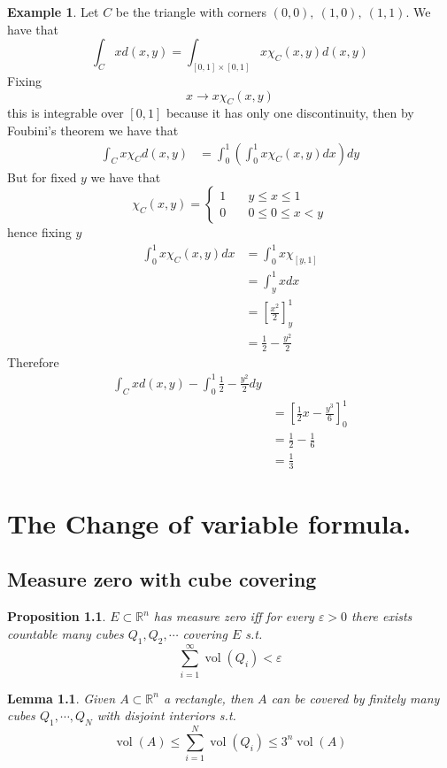 \documentclass[11pt,openany]{book}
\theoremstyle{plain}
\newtheorem{lemma}{Lemma}[chapter]
\newtheorem{proposition}{Proposition}[chapter]
\theoremstyle{definition}
\newtheorem{example}{Example}[chapter]
\theoremstyle{remark}
\newcommand{\R}{\mathbb{R}}
\newcommand{\vol}{\operatorname{vol}}
\begin{document}
\begin{example}
    Let $C$ be the triangle with corners $(0,0), \ (1, 0), \ (1,1)$. We have that 
    $$\int_C x d(x,y) = \int_{[0,1] \times [0,1]} x \chi_C (x,y) d(x,y)$$
    Fixing 
    $$x \to x \chi_C (x,y)$$
    this is integrable over $[0,1]$ because it has only one discontinuity, then by Foubini's theorem we have that 
    \begin{align*}
        \int_C x \chi_C d(x,y) &= \int_{0}^1 \left(\int_{0}^1 x \chi_C (x,y) dx\right)dy 
    \end{align*}
    But for fixed $y$ we have that 
    $$\chi_C (x,y) = \begin{cases}
        1 \quad&  y \le x \le 1\\
        0 \quad& 0 \le 0 \le x < y
    \end{cases}$$
    hence fixing $y$
    \begin{align*}
        \int_{0}^1 x \chi_C(x,y) dx  &= \int_{0}^1 x \chi_{[y,1]} \\
        &= \int_y^1 x dx \\
        &= [\frac{x^2}{2}]_y^1 \\
        &= \frac{1}{2} - \frac{y^2}{2}
    \end{align*}
    Therefore 
    \begin{align*}
        \int_C x d(x,y) - \int_0^1 \frac{1}{2} - \frac{y^2}{2} dy \\
        &= \left[\frac{1}{2}x - \frac{y^3}{6}\right]_0^1 \\
        &= \frac{1}{2} - \frac{1}{6} \\
        &= \frac{1}{3}
    \end{align*}
\end{example}

\chapter{The Change of variable formula.} 
\section{Measure zero with cube covering}
\begin{proposition}
    $E \subset \R^n$ has measure zero iff for every $\varepsilon > 0$ there exists countable many cubes $Q_1, Q_2, \cdots$ covering
    $E$ s.t. 
    $$\sum_{i=1}^\infty \vol (Q_i) < \varepsilon$$ 
\end{proposition}

 \begin{lemma}
    Given $A \subset \R^n$ a rectangle, then $A$ can be covered by finitely many cubes $Q_1, \cdots, Q_N$ with disjoint interiors 
    s.t. 
    $$\vol (A) \le \sum_{i=1}^N \vol (Q_i) \le 3^n \vol (A)$$
\end{lemma}
\end{document}
